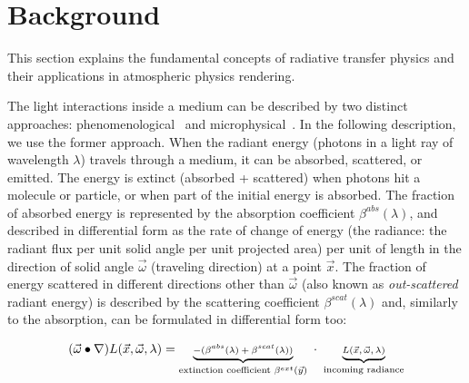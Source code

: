\documentclass[journal]{vgtc}                %
\newcommand{\review}[1]{{\color{blue}#1}}
\begin{document}



\section{Background}\label{sec:background}

This section explains the \review{fundamental} concepts of radiative transfer physics and \review{their applications in atmospheric} physics rendering.

The light interactions inside a medium can be described by two distinct approaches: phenomenological~\cite{Chandrasekhar:1960, Preisendorfer:1965} and microphysical~\cite{Mishchenko:article:2006}. In the following description, we use the former approach. When the radiant energy (photons in a light ray of wavelength $\lambda$) travels through a medium, it can be absorbed, scattered, or emitted. The energy is extinct (absorbed + scattered) when photons hit a molecule or particle\review{,} or when part of the initial energy is absorbed. The fraction of absorbed energy is represented by the absorption coefficient $\beta^{abs}(\lambda)$, and described in differential form as the rate \review{of} change of energy (the radiance: the radiant flux per unit solid angle per unit projected area) per unit of length in the direction of solid angle $\vec{\omega}$ (traveling direction) at a point $\vec{x}$. The fraction of energy scattered in different directions other than $\vec{\omega}$ (also known as \textit{out-scattered} radiant energy) is described by the scattering coefficient $\beta^{scat}(\lambda)$ and, \review{similarly} to the absorption, can be formulated in differential form too:

\vspace*{-1.5mm}
\begin{equation}\label{eq:extinction}
\small
(\vec{\omega}\bullet \nabla)L(\vec{x},\vec{\omega}, \lambda) = 
	\underbrace{-(\beta^{abs}(\lambda) + \beta^{scat}(\lambda))}_{\text{extinction coefficient }\beta^{ext}(\vec{y})} 
	\,\, \cdot \,\, \underbrace{L(\vec{x},\vec{\omega}, \lambda)}_{\text{incoming radiance}}
\end{equation}
\end{document}
